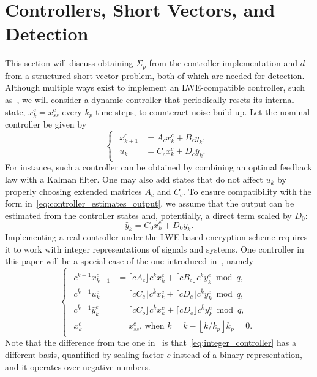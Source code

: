 \documentclass[journal, twoside, web]{ieeecolorpreprint}
\begin{document}
\section{Controllers, Short Vectors, and Detection} \label{sec:controllers}
This section will discuss obtaining $\Sigma_p$ from the controller implementation and $d$ from a structured short vector problem, both of which are needed for detection. Although multiple ways exist to implement an LWE-compatible controller, such as~\cite{kim2022dynamic}, we will consider a dynamic controller that periodically resets its internal state, $x_k^c = x_{ss}^c$ every $k_p$ time steps, to counteract noise build-up. Let the nominal controller be given by
\begin{equation}\label{eq:controller_real}
    \begin{cases}
    \begin{aligned}
    x^c_{k+1} & =  A_cx^c_k + B_c \bar y_{k}, \\
     u_k & =   C_cx^c_k + D_c \bar y_{k}. 
    \end{aligned}
    \end{cases}
\end{equation}
For instance, such a controller can be obtained by combining an optimal feedback law with a Kalman filter. One may also add states that do not affect $u_k$ by properly choosing extended matrices $A_c$ and $C_c$. To ensure compatibility with the form in~\eqref{eq:controller_estimates_output}, we assume that the output can be estimated from the controller states and, potentially, a direct term scaled by $D_0$:
\begin{equation} \label{eq:estimate_output}
    \hat y_k= C_0x_k^c+D_0\bar y_{k}.
\end{equation}
Implementing a real controller under the LWE-based encryption scheme requires it to work with integer representations of signals and systems. One controller in this paper will be a special case of the one introduced in~\cite{murguia2020}, namely
\begin{equation}\label{eq:integer_controller}
    \begin{cases}
    \begin{aligned}
    c^{\bar k+1}x^c_{k+1} & =  \lceil c A_c \rfloor c^{\bar k} x^c_k + \lceil cB_c \rfloor c^{\bar k} y^e_{k} \bmod q, \\
     c^{\bar k+1} u^e_k & =   \lceil c C_c \rfloor c^{\bar k} x^c_k + \lceil c D_c \rfloor c^{\bar k} y^e_{k} \bmod q, \\
     c^{\bar k+1} \hat{y}^e_{k} & = \lceil c  C_o \rfloor c^{\bar k} x_k^c+\lceil c  D_o \rfloor c^{\bar k} y_{k}^e \bmod q, \\
     x^c_k & = x^c_{ss}, \, \text{when } \bar k= k - \left\lfloor k/k_p\right\rfloor k_p = 0.
    \end{aligned}
    \end{cases}
\end{equation}
Note that the difference from the one in~\cite{murguia2020} is that~\eqref{eq:integer_controller} has a different basis, quantified by scaling factor $c$ instead of a binary representation, and it operates over negative numbers.
\end{document}
